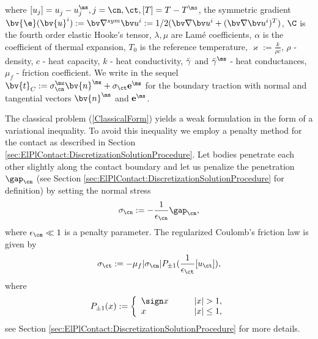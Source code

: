 where $[u_j] = u^{\sl}_j - u^{\ms}_j, j=\cn,\ct, [T] = T^{\sl} - T^{\ms}$, the symmetric gradient $\bv{\e}(\bv{u}^i) := \bv \nabla^{sym} \bv u^i := 1/2 (\bv \nabla \bv u^i + (\bv \nabla \bv u^i)^T )$, $\C$ is the fourth order elastic Hooke's tensor, $\lambda, \mu$ are Lam\'e coefficients, $\alpha$ is the coefficient of thermal expansion, $T_0$ is the reference temperature, $\varkappa:=\frac{k}{\rho c}$, $\rho$ - density, $c$ - heat  capacity, $k$ - heat conductivity, $\bar{\gamma}^{\sl}$ and $\bar{\gamma}^{\ms}$ - heat conductances, $\mu_f$ - friction coefficient.
We write in the sequel $\bv{t}_C := \sigma_\cn^{\ms} \bv{n}^{\ms} + \sigma_\ct \mathbf{e}^{\ms}$ for the boundary traction with normal and tangential vectors $\bv{n}^{\ms}$ and $\mathbf{e}^{\ms}$.



The classical problem (\ref{ClassicalForm}) yields a weak formulation in the form of a variational inequality. To avoid this inequality we employ a penalty method for the contact as described in Section \ref{sec:ElPlContact:DiscretizationSolutionProcedure}. Let bodies penetrate each other slightly along the contact boundary and let us penalize the penetration $\gap_{\cn}$ (see Section \ref{sec:ElPlContact:DiscretizationSolutionProcedure} for definition) by setting the normal stress
\[
\sigma_{\cn} := -\dfrac{1}{\epsilon_{\cn}} \gap_{\cn},
\]
where $\epsilon_{\cn} \ll 1$ is a penalty parameter. The regularized Coulomb's friction law is given by
\[
\sigma_\ct := - \mu_f |\sigma_\cn| P_{\pm1} (\dfrac{1}{\epsilon_{\ct}} [u_\ct]),
\]
where 
\begin{equation*}
P_{\pm1} (x) := 
\left\lbrace 
\begin{array}{ll}
\sign x &\qquad |x| > 1, \\
x & \qquad |x| \leq 1,
\end{array}
\right. 
\end{equation*}
see Section \ref{sec:ElPlContact:DiscretizationSolutionProcedure} for more details.

